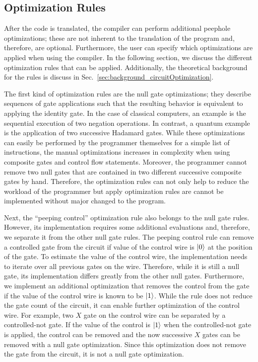 \subsection{Optimization Rules}
After the code is translated, the compiler can perform additional peephole optimizations; these are not inherent to the translation of the program and, therefore, are optional.
Furthermore, the user can specify which optimizations are applied when using the compiler. In the following section, we discuss the different optimization rules that can be applied. Additionally, the theoretical background for the rules is discuss in Sec.~\ref{sec:background_circuitOptimization}.

The first kind of optimization rules are the null gate optimizations; they describe sequences of gate applications such that the resulting behavior is equivalent to applying the identity gate. In the case of classical computers, an example is the sequential execution of two negation operations. In contrast, a quantum example is the application of two successive Hadamard gates. While these optimizations can easily be performed by the programmer themselves for a simple list of instructions, the manual optimizations increases in complexity when using composite gates and control flow statements. Moreover, the programmer cannot remove two null gates that are contained in two different successive composite gates by hand. Therefore, the optimization rules can not only help to reduce the workload of the programmer but apply optimization rules are cannot be implemented without major changed to the program.

Next, the ``peeping control'' optimization rule also belongs to the null gate rules. However, its implementation requires some additional evaluations and, therefore, we separate it from the other null gate rules. The peeping control rule can remove a controlled gate from the circuit if value of the control wire is $\ket{0}$ at the position of the gate. To estimate the value of the control wire, the implementation needs to iterate over all previous gates on the wire. Therefore, while it is still a null gate, its implementation differs greatly from the other null gates. Furthermore, we implement an additional optimization that removes the control from the gate if the value of the control wire is known to be $\ket{1}$. While the rule does not reduce the gate count of the circuit, it can enable further optimization of the control wire. For example, two $X$ gate on the control wire can be separated by a controlled-not gate. If the value of the control is $\ket{1}$ when the controlled-not gate is applied, the control can be removed and the now successive $X$ gates can be removed with a null gate optimization. Since this optimization does not remove the gate from the circuit, it is not a null gate optimization.

